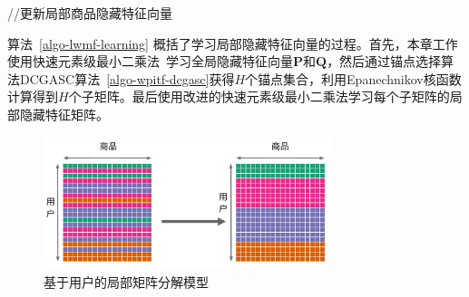 \begin{algorithm}
\begin{algorithmic}[1]
			//更新局部商品隐藏特征向量

			
			
				\ENDFOR
			
			
					\ENDFOR
			
			
					\ENDFOR
			
				\ENDFOR
			\ENDFOR
				
		\ENDFOR
		
		
	\end{algorithmic}
\end{algorithm}

算法~\ref{algo-lwmf-learning} 概括了学习局部隐藏特征向量的过程。首先，本章工作使用快速元素级最小二乘法~\cite{he2016fast}学习全局隐藏特征向量$\mathbf{P}$和$\mathbf{Q}$，然后通过锚点选择算法DCGASC算法~\ref{algo-wpitf-dcgasc}获得$H$个锚点集合，利用Epanechnikov核函数计算得到$H$个子矩阵。最后使用改进的快速元素级最小二乘法学习每个子矩阵的局部隐藏特征矩阵。

\begin{figure}
	\centering
	\includegraphics[width=0.75\textwidth]{Fig/lwmf/user}
	\caption{基于用户的局部矩阵分解模型}
	\label{fig-lwmf-user}
\end{figure}

